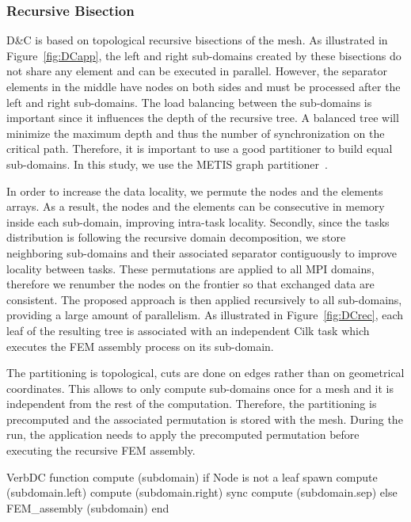 \documentclass[10pt]{IOS-Book-Article}
\begin{document}
\subsubsection{Recursive Bisection}
\label{sec:DCrec}
D\&C is based on topological recursive bisections of the mesh.
As illustrated in Figure~\ref{fig:DCapp}, the left and right sub-domains created by these bisections do not share any element and can be executed in parallel.
However, the separator elements in the middle have nodes on both sides and must be processed after the left and right sub-domains.
The load balancing between the sub-domains is important since it influences the depth of the recursive tree.
A balanced tree will minimize the maximum depth and thus the number of synchronization on the critical path.
Therefore, it is important to use a good partitioner to build equal sub-domains.
In this study, we use the METIS graph partitioner~\cite{Metis}.

In order to increase the data locality, we permute the nodes and the elements arrays.
As a result, the nodes and the elements can be consecutive in memory inside each sub-domain, improving intra-task locality.
Secondly, since the tasks distribution is following the recursive domain decomposition, we store neighboring sub-domains and their associated separator contiguously to improve locality between tasks.
These permutations are applied to all MPI domains, therefore we renumber the nodes on the frontier so that exchanged data are consistent.
The proposed approach is then applied recursively to all sub-domains, providing a large amount of parallelism.
As illustrated in Figure~\ref{fig:DCrec}, each leaf of the resulting tree is associated with an independent Cilk task which executes the FEM assembly process on its sub-domain.

The partitioning is topological, cuts are done on edges rather than on geometrical coordinates.
This allows to only compute sub-domains once for a mesh and it is independent from the rest of the computation.
Therefore, the partitioning is precomputed and the associated permutation is stored with the mesh.
During the run, the application needs to apply the precomputed permutation before executing the recursive FEM assembly.


\begin{SaveVerbatim}[]{VerbDC}
function compute (subdomain) 
  if Node is not a leaf
    spawn compute (subdomain.left)
    compute (subdomain.right)
    sync
    compute (subdomain.sep)
  else
    FEM_assembly (subdomain)
end    
\end{SaveVerbatim}
\end{document}
